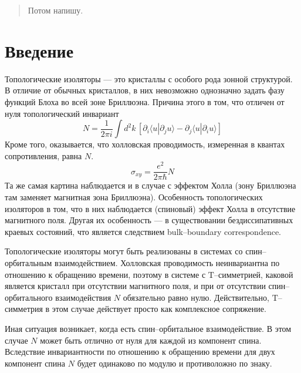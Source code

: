 	\newpage
	\begin{abstract}
        Потом напишу.
	\end{abstract}
	\section{Введение}
    Топологические изоляторы --- это кристаллы с особого рода зонной структурой.
    В отличие от обычных кристаллов, в них невозможно однозначно задать фазу функций 
    Блоха во всей зоне Бриллюэна. Причина этого в том, что отличен от нуля
    топологический инвариант 
    \begin{equation}
        \label{TKNN}
        N = \frac{1}{2\pi i} 
            \int d^2 k\, \left[\partial_i \langle u | \partial_j u \rangle -
            \partial_j \langle u | \partial_i u \rangle \right]
    \end{equation}
    Кроме того, оказывается, что холловская проводимость, измеренная в квантах 
    сопротивления, равна $N$.
    \begin{equation}
        \sigma_{xy} = \frac{e^2}{2\pi \hbar} N
    \end{equation}
    Та же самая картина наблюдается и в случае с эффектом Холла (зону Бриллюэна там 
    заменяет магнитная зона Бриллюэна). Особенность топологических изоляторов в том,
    что в них наблюдается (спиновый) эффект Холла в отсутствие магнитного поля. Другая
    их особенность --- в существовании бездиссипативных краевых состояний, что является
    следствием bulk--boundary correspondence. 

    Топологические изоляторы могут быть реализованы в системах со спин--орбитальным 
    взаимодействием. Холловская проводимость неинвариантна по отношению к обращению
    времени, поэтому в системе с $\mathrm{T}$--симметрией, каковой является кристалл 
    при отсутствии магнитного поля, и при от отсутствии спин--орбитального взаимодействия
    $N$ обязательно равно нулю. Действительно, $\mathrm{T}$--симметрия в этом случае 
    действует просто как комплексное сопряжение. 

    Иная ситуация возникает, когда есть
    спин--орбитальное взаимодействие. В этом случае $N$ может быть отлично от нуля
    для каждой из компонент спина. Вследствие инвариантности по отношению к обращению
    времени для двух компонент спина $N$ будет одинаково по модулю и противоложно 
    по знаку.
